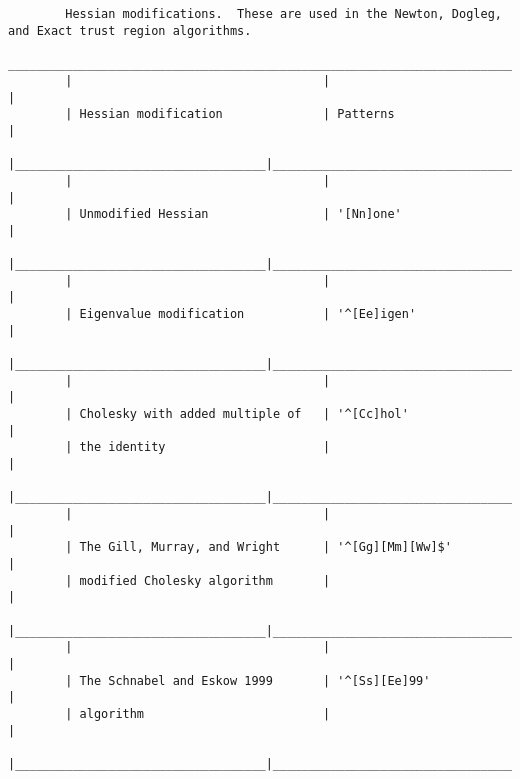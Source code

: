 \begin{verbatim}
    
    
        Hessian modifications.  These are used in the Newton, Dogleg, and Exact trust region algorithms.
        ___________________________________________________________________________________________
        |                                   |                                                     |
        | Hessian modification              | Patterns                                            |
        |___________________________________|_____________________________________________________|
        |                                   |                                                     |
        | Unmodified Hessian                | '[Nn]one'                                           |
        |___________________________________|_____________________________________________________|
        |                                   |                                                     |
        | Eigenvalue modification           | '^[Ee]igen'                                         |
        |___________________________________|_____________________________________________________|
        |                                   |                                                     |
        | Cholesky with added multiple of   | '^[Cc]hol'                                          |
        | the identity                      |                                                     |
        |___________________________________|_____________________________________________________|
        |                                   |                                                     |
        | The Gill, Murray, and Wright      | '^[Gg][Mm][Ww]$'                                    |
        | modified Cholesky algorithm       |                                                     |
        |___________________________________|_____________________________________________________|
        |                                   |                                                     |
        | The Schnabel and Eskow 1999       | '^[Ss][Ee]99'                                       |
        | algorithm                         |                                                     |
        |___________________________________|_____________________________________________________|
    
    
    

\end{verbatim}
